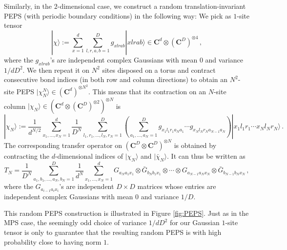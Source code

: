 \documentclass{amsart}
\newcommand{\C}{\mathbf{C}}
\newcommand{\ket}[1]{| #1 \rangle}
\begin{document}
Similarly, in the $2$-dimensional case, we construct a random translation-invariant PEPS (with periodic boundary conditions) in the following way: We pick as $1$-site tensor
\begin{equation} \label{eq:PEPS}
    \ket{\chi} := \sum_{x=1}^d \sum_{l,r,a,b=1}^D g_{xlrab}\ket{xlrab} \in \C^d\otimes(\C^D)^{\otimes 4} \, ,
\end{equation}
where the $g_{xlrab}$'s are independent complex Gaussians with mean $0$ and variance $1/dD^2$. We then repeat it on $N^2$ sites disposed on a torus and contract consecutive bond indices (in both row and column directions) to obtain an $N^2$-site PEPS $\ket{\chi^{N}_N}\in(\C^d)^{\otimes N^2}$. This means that its contraction on an $N$-site column $\ket{\chi_N}\in (\C^d\otimes(\C^D)^{\otimes 2})^{\otimes N}$ is
\begin{equation} \label{eq:PEPS'}
    \ket{\chi_N} := \frac{1}{d^{N/2}} \sum_{x_1,\ldots,x_N=1}^d \frac{1}{D^{N}} \sum_{l_1,r_1,\ldots,l_N,r_N=1}^D \left( \sum_{a_1,\ldots,a_N=1}^D g_{x_1l_1r_1a_Na_1}\cdots g_{x_Nl_Nr_Na_{N-1}a_N} \right) \ket{x_1l_1r_1\cdots x_Nl_Nr_N} \, .
\end{equation}
The corresponding transfer operator on $(\C^D\otimes\C^D)^{\otimes N}$ is obtained by contracting the $d$-dimensional indices of $\ket{\chi_N}$ and $\ket{\bar{\chi}_N}$. It can thus be written as
\begin{equation} \label{eq:transfer-PEPS}
    T_N = \frac{1}{D^N} \sum_{a_1,b_1,\ldots,a_N,b_N=1}^D \frac{1}{d^N} \sum_{x_1,\ldots,x_N=1}^d G_{a_Na_1x_1} \otimes \bar{G}_{b_Nb_1x_1}\otimes \cdots\otimes G_{a_{N-1}a_Nx_N} \otimes \bar{G}_{b_{N-1}b_Nx_N} \, ,
\end{equation}
where the $G_{a_{i-1}a_ix_i}$'s are independent $D\times D$ matrices whose entries are independent complex Gaussians with mean $0$ and variance $1/D$.

This random PEPS construction is illustrated in Figure \ref{fig:PEPS}. Just as in the MPS case, the seemingly odd choice of variance $1/dD^2$ for our Gaussian $1$-site tensor is only to guarantee that the resulting random PEPS is with high probability close to having norm $1$.
\end{document}
